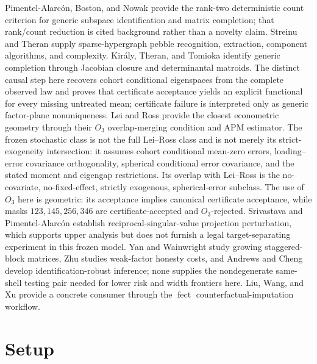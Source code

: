 \documentclass{article}
\begin{document}
Pimentel-Alarcón, Boston, and Nowak provide the rank-two deterministic count criterion for generic subspace identification and matrix completion; that rank/count reduction is cited background rather than a novelty claim. Streinu and Theran supply sparse-hypergraph pebble recognition, extraction, component algorithms, and complexity. Király, Theran, and Tomioka identify generic completion through Jacobian closure and determinantal matroids. The distinct causal step here recovers cohort conditional eigenspaces from the complete observed law and proves that certificate acceptance yields an explicit functional for every missing untreated mean; certificate failure is interpreted only as generic factor-plane nonuniqueness. Lei and Ross provide the closest econometric geometry through their \(O_3\) overlap-merging condition and APM estimator. The frozen stochastic class is not the full Lei--Ross class and is not merely its strict-exogeneity intersection: it assumes cohort conditional mean-zero errors, loading--error covariance orthogonality, spherical conditional error covariance, and the stated moment and eigengap restrictions. Its overlap with Lei--Ross is the no-covariate, no-fixed-effect, strictly exogenous, spherical-error subclass. The use of \(O_3\) here is geometric: its acceptance implies canonical certificate acceptance, while masks \(123,145,256,346\) are certificate-accepted and \(O_3\)-rejected. Srivastava and Pimentel-Alarcón establish reciprocal-singular-value projection perturbation, which supports upper analysis but does not furnish a legal target-separating experiment in this frozen model. Yan and Wainwright study growing staggered-block matrices, Zhu studies weak-factor honesty costs, and Andrews and Cheng develop identification-robust inference; none supplies the nondegenerate same-shell testing pair needed for lower risk and width frontiers here. Liu, Wang, and Xu provide a concrete consumer through the \(\operatorname{fect}\) counterfactual-imputation workflow.

\section{Setup}
\end{document}
